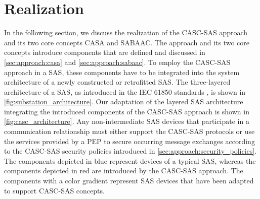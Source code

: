 \section{Realization}
\label{sec:approach:realization}
In the following section, we discuss the realization of the CASC-SAS approach and its two core concepts CASA and SABAAC.
The approach and its two core concepts introduce components that are defined and discussed in \autoref{sec:approach:casa} and \autoref{sec:approach:sabaac}.
To employ the CASC-SAS approach in a SAS, these components have to be integrated into the system architecture of a newly constructed or retrofitted SAS.
The three-layered architecture of a SAS, as introduced in the IEC 61850 standards \cite{IEC61850P8}, is shown in \autoref{fig:substation_architecture}.
Our adaptation of the layered SAS architecture integrating the introduced components of the CASC-SAS approach is shown in \autoref{fig:casc_architecture}.
Any non-intermediate SAS devices that participate in a communication relationship must either support the CASC-SAS protocols or use the services provided by a PEP to secure occurring message exchanges according to the CASC-SAS security policies introduced in \autoref{sec:approach:security_policies}.
The components depicted in blue represent devices of a typical SAS, whereas the components depicted in red are introduced by the CASC-SAS approach.
The components with a color gradient represent SAS devices that have been adapted to support CASC-SAS concepts.

